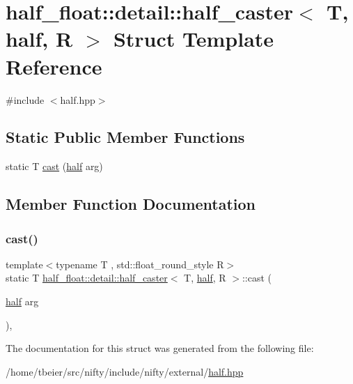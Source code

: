 \hypertarget{structhalf__float_1_1detail_1_1half__caster_3_01T_00_01half_00_01R_01_4}{}\section{half\+\_\+float\+:\+:detail\+:\+:half\+\_\+caster$<$ T, half, R $>$ Struct Template Reference}
\label{structhalf__float_1_1detail_1_1half__caster_3_01T_00_01half_00_01R_01_4}


{\ttfamily \#include $<$half.\+hpp$>$}

\subsection*{Static Public Member Functions}
\begin{DoxyCompactItemize}
\item 
static T \hyperlink{structhalf__float_1_1detail_1_1half__caster_3_01T_00_01half_00_01R_01_4_abab2f9d3906f11fd4a24493c0121b14a}{cast} (\hyperlink{classhalf__float_1_1half}{half} arg)
\end{DoxyCompactItemize}


\subsection{Member Function Documentation}
\mbox{\label{structhalf__float_1_1detail_1_1half__caster_3_01T_00_01half_00_01R_01_4_abab2f9d3906f11fd4a24493c0121b14a}} 
\subsubsection{\texorpdfstring{cast()}{cast()}}
{\footnotesize\ttfamily template$<$typename T , std\+::float\+\_\+round\+\_\+style R$>$ \\
static T \hyperlink{structhalf__float_1_1detail_1_1half__caster}{half\+\_\+float\+::detail\+::half\+\_\+caster}$<$ T, \hyperlink{classhalf__float_1_1half}{half}, R $>$\+::cast (\begin{DoxyParamCaption}\item[{\hyperlink{classhalf__float_1_1half}{half}}]{arg }\end{DoxyParamCaption})\hspace{0.3cm}{\ttfamily [inline]}, {\ttfamily [static]}}



The documentation for this struct was generated from the following file\+:\begin{DoxyCompactItemize}
\item 
/home/tbeier/src/nifty/include/nifty/external/\hyperlink{half_8hpp}{half.\+hpp}\end{DoxyCompactItemize}
